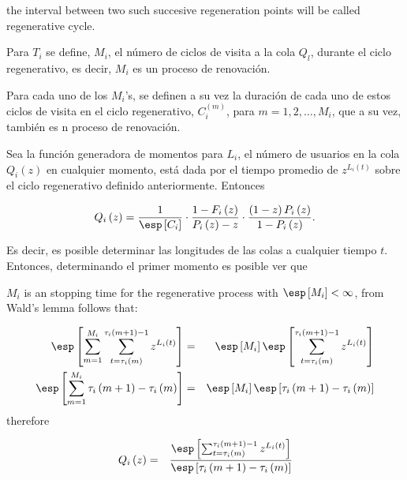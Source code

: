 \begin{Def}
the interval between two such succesive regeneration points will be called regenerative cycle.
\end{Def}

\begin{Def}
Para $T_{i}$ se define, $M_{i}$, el n\'umero de ciclos de visita a la cola $Q_{l}$, durante el ciclo regenerativo, es decir, $M_{i}$ es un proceso de renovaci\'on.
\end{Def}

\begin{Def}
Para cada uno de los $M_{i}$'s, se definen a su vez la duraci\'on de cada uno de estos ciclos de visita en el ciclo regenerativo, $C_{i}^{(m)}$, para $m=1,2,\ldots,M_{i}$, que a su vez, tambi\'en es n proceso de renovaci\'on.
\end{Def}



Sea la funci\'on generadora de momentos para $L_{i}$, el n\'umero de usuarios en la cola $Q_{i}\left(z\right)$ en cualquier momento, est\'a dada por el tiempo promedio de $z^{L_{i}\left(t\right)}$ sobre el ciclo regenerativo definido anteriormente. Entonces 

\begin{equation}\label{Eq.Longitud.Tiempo.t}
Q_{i}\left(z\right)=\frac{1}{\esp\left[C_{i}\right]}\cdot\frac{1-F_{i}\left(z\right)}{P_{i}\left(z\right)-z}\cdot\frac{\left(1-z\right)P_{i}\left(z\right)}{1-P_{i}\left(z\right)}.
\end{equation}

Es decir, es posible determinar las longitudes de las colas a cualquier tiempo $t$. Entonces, determinando el primer momento es posible ver que


$M_{i}$ is an stopping time for the regenerative process with $\esp\left[M_{i}\right]<\infty$, from Wald's lemma follows that:


\begin{eqnarray*}
\esp\left[\sum_{m=1}^{M_{i}}\sum_{t=\tau_{i}\left(m\right)}^{\tau_{i}\left(m+1\right)-1}z^{L_{i}\left(t\right)}\right]&=&\esp\left[M_{i}\right]\esp\left[\sum_{t=\tau_{i}\left(m\right)}^{\tau_{i}\left(m+1\right)-1}z^{L_{i}\left(t\right)}\right]\\
\esp\left[\sum_{m=1}^{M_{i}}\tau_{i}\left(m+1\right)-\tau_{i}\left(m\right)\right]&=&\esp\left[M_{i}\right]\esp\left[\tau_{i}\left(m+1\right)-\tau_{i}\left(m\right)\right]
\end{eqnarray*}
therefore 

\begin{eqnarray*}
Q_{i}\left(z\right)&=&\frac{\esp\left[\sum_{t=\tau_{i}\left(m\right)}^{\tau_{i}\left(m+1\right)-1}z^{L_{i}\left(t\right)}\right]}{\esp\left[\tau_{i}\left(m+1\right)-\tau_{i}\left(m\right)\right]}
\end{eqnarray*}

